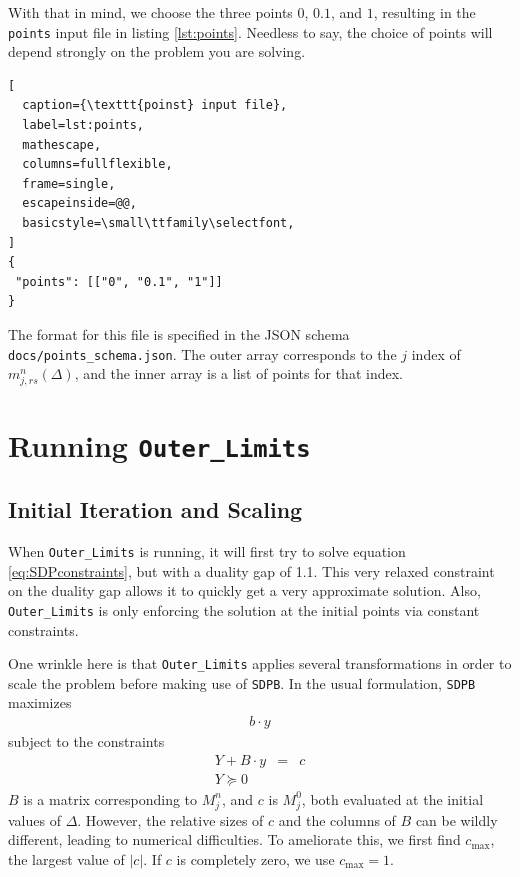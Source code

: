 \documentclass[12pt]{article}
\numberwithin{equation}{section}
\begin{document}
With that in mind, we choose the three points $0$, $0.1$, and $1$,
resulting in the \texttt{points} input file in listing \ref{lst:points}.
Needless to say, the choice of points will depend strongly on the
problem you are solving.

\begin{lstlisting}[
  caption={\texttt{poinst} input file},
  label=lst:points,
  mathescape,
  columns=fullflexible,
  frame=single,
  escapeinside=@@,
  basicstyle=\small\ttfamily\selectfont,
]
{
 "points": [["0", "0.1", "1"]]
}
\end{lstlisting}

The format for this file is specified in the JSON schema
\texttt{docs/points\_schema.json}.  The outer array corresponds to the
$j$ index of $m_{j,rs}^{n}(\Delta)$, and the inner array is a list
of points for that index.

\section{Running \texttt{Outer\_Limits}}
\label{sec:running}

\subsection{Initial Iteration and Scaling}
\label{subsec:initial}

When \texttt{Outer\_Limits} is running, it will first try to solve
equation \ref{eq:SDPconstraints}, but with a duality gap of 1.1.  This
very relaxed constraint on the duality gap allows it to quickly get a
very approximate solution.  Also, \texttt{Outer\_Limits} is only
enforcing the solution at the initial points via constant constraints.

One wrinkle here is that \texttt{Outer\_Limits} applies several
transformations in order to scale the problem before making use of
\texttt{SDPB}.  In the usual formulation, \texttt{SDPB} maximizes
\begin{eqnarray}
  b\cdot y
\end{eqnarray}
subject to the constraints
\begin{eqnarray}
  Y + B\cdot y & = & c\\
  Y \succeq 0
\end{eqnarray}
$B$ is a matrix corresponding to $M^n_j$, and $c$ is $M^0_j$, both evaluated
at the initial values of $\Delta$.  However, the relative sizes
of $c$ and the columns of $B$ can be wildly different, leading to
numerical difficulties.  To ameliorate this, we first find $c_{\max}$,
the largest value of $|c|$.  If $c$ is completely zero, we use
$c_{\max}=1$.
\end{document}
